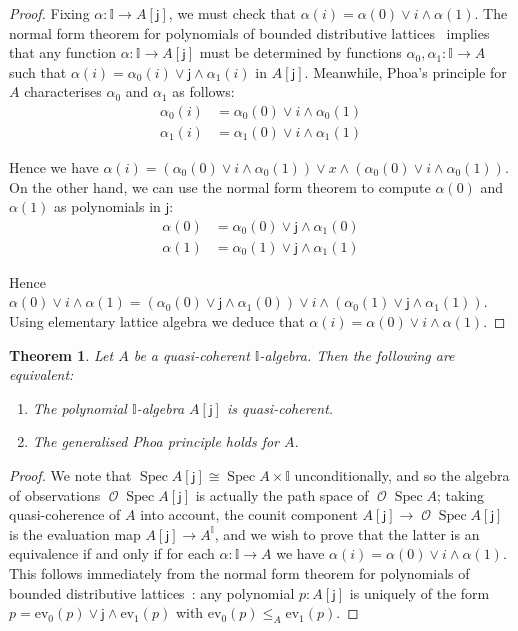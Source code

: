 \documentclass[a4paper,12pt]{amsart}
\newtheorem{theorem}{Theorem}[section]
\theoremstyle{definition}
\newcommand{\mc}[1]{\mathcal{#1}}
\newcommand{\mbb}[1]{\mathbb{#1}}
\newcommand{\I}{\mbb I}
\newcommand{\ms}[1]{\mathsf{#1}}
\newcommand{\ev}{\mathrm{ev}}
\newcommand{\spec}{\operatorname{Spec}}
\newcommand{\opens}{\operatorname{\mc{O}}} %
\begin{document}
\begin{proof}
  Fixing $\alpha\colon \I\to A[\ms{j}]$, we must check that $\alpha(i) = \alpha(0) \vee i \wedge \alpha(1)$. 
  The normal form theorem for polynomials of bounded distributive lattices~\citep[Ch.\ 1, Thm.\ 10.11]{lausch2000algebra} implies that any function $\alpha\colon \I\to A[\ms{j}]$ must be determined by functions $\alpha_0,\alpha_1\colon \I\to A$ such that $\alpha(i) = \alpha_0(i)\vee \ms{j} \wedge \alpha_1(i)$ in $A[\ms{j}]$. Meanwhile, Phoa's principle for $A$ characterises $\alpha_0$ and $\alpha_1$ as follows:
  \begin{align*}
    \alpha_0(i) &= \alpha_0(0) \vee i \wedge \alpha_0(1)
    \\ 
    \alpha_1(i) &= \alpha_1(0) \vee i \wedge \alpha_1(1)
  \end{align*}

  Hence we have $\alpha(i) = (\alpha_0(0) \vee i \wedge \alpha_0(1))\lor x \wedge (\alpha_0(0) \vee i \wedge \alpha_0(1))$. On the other hand, we can use the normal form theorem to compute $\alpha(0)$ and $\alpha(1)$ as polynomials in $\ms{j}$: 
  \begin{align*}
    \alpha(0) &= \alpha_0(0) \vee \ms{j}\wedge \alpha_1(0)\\
    \alpha(1) &= \alpha_0(1) \vee \ms{j}\wedge \alpha_1(1)
  \end{align*}

  Hence $\alpha(0)\lor i \wedge \alpha(1) = (\alpha_0(0) \vee \ms{j}\wedge \alpha_1(0))\vee i \wedge (\alpha_0(1) \vee \ms{j}\wedge \alpha_1(1))$. Using elementary lattice algebra we deduce that $\alpha(i) = \alpha(0) \vee i \wedge \alpha(1)$.
\end{proof}

\begin{theorem}\label{obs:sqcp-phoa-gen}
  Let $A$ be a quasi-coherent $\I$-algebra. Then the following are equivalent:
  \begin{enumerate}
    \item The polynomial $\I$-algebra $A[\ms{j}]$ is quasi-coherent.
    \item The generalised Phoa principle holds for $A$.
  \end{enumerate}
\end{theorem}

\begin{proof}
  We note that $\spec{A[\ms{j}]} \cong \spec{A}\times \I$ unconditionally, and so the algebra of observations $\opens\spec{A[\ms{j}]}$ is actually the path space of $\opens\spec{A}$; taking quasi-coherence of $A$ into account, the counit component $A[\ms{j}]\to \opens\spec A[\ms{j}]$ is the evaluation map $A[\ms{j}] \to A^\I$, and we wish to prove that the latter is an equivalence if and only if for each $\alpha\colon \I\to A$ we have $\alpha(i)=\alpha(0)\vee i\wedge\alpha(1)$. 
  This follows immediately from the normal form theorem for polynomials of bounded distributive lattices~\citep[Ch.\ 1, Thm.\ 10.11]{lausch2000algebra}: any polynomial $p:A[\ms{j}]$ is uniquely of the form $p = \ev_0(p) \vee \ms{j} \wedge \ev_1(p)$ with $\ev_0(p)\le_A \ev_1(p)$.
\end{proof}
\end{document}
